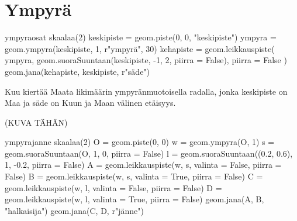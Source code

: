 \section*{Ympyrä}

\begin{luoKuva}{ympyraosat}
	skaalaa(2)
	keskipiste = geom.piste(0, 0, "keskipiste")
	ympyra = geom.ympyra(keskipiste, 1, r"ympyr\"{a}", 30)
	kehapiste = geom.leikkauspiste(
		ympyra, geom.suoraSuuntaan(keskipiste, -1, 2, piirra = False), piirra = False
	)
	geom.jana(kehapiste, keskipiste, r"s\"{a}de")
\end{luoKuva}
\begin{center}
\end{center}

\begin{esimerkki} %
Kuu kiertää Maata likimäärin ympyränmuotoisella radalla, jonka keskipiste on Maa ja säde on Kuun ja Maan välinen etäisyys.
\end{esimerkki}

(KUVA TÄHÄN)

\begin{luoKuva}{ympyrajanne}
	skaalaa(2)
	O = geom.piste(0, 0)
	w = geom.ympyra(O, 1)
	s = geom.suoraSuuntaan(O, 1, 0, piirra = False)
	l = geom.suoraSuuntaan((0.2, 0.6), 1, -0.2, piirra = False)
	A = geom.leikkauspiste(w, s, valinta = False, piirra = False)
	B = geom.leikkauspiste(w, s, valinta = True, piirra = False)
	C = geom.leikkauspiste(w, l, valinta = False, piirra = False)
	D = geom.leikkauspiste(w, l, valinta = True, piirra = False)
	geom.jana(A, B, "halkaisija")
	geom.jana(C, D, r"j\"{a}nne")
\end{luoKuva}


\begin{center}
\end{center}


